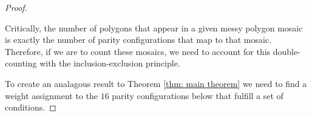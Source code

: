 \documentclass[12pt]{article}
\theoremstyle{plain}
\theoremstyle{definition}
\theoremstyle{remark}
\theoremstyle{definition}
\newcommand{\cellA}[4]{ \draw[thick] ( #1 , #2 ) rectangle ( #3 , #4 ); \draw[red, thick, densely dotted] (#3 * 0.5 + #1 * 0.5 , #2) -- (#3, #4 * 0.5 + #2 * 0.5);}
\newcommand{\cellB}[4]{ \draw[thick] ( #1 , #2 ) rectangle ( #3 , #4 ); \draw[red, thick, densely dotted] (#3 * 0.5 + #1 * 0.5 , #2) -- (#1, #4 * 0.5 + #2 * 0.5);}
\newcommand{\cellC}[4]{ \draw[thick] ( #1 , #2 ) rectangle ( #3 , #4 ); \draw[red, thick, densely dotted] (#3 * 0.5 + #1 * 0.5 , #4) -- (#1, #4 * 0.5 + #2 * 0.5);}
\newcommand{\cellD}[4]{ \draw[thick] ( #1 , #2 ) rectangle ( #3 , #4 ); \draw[red, thick, densely dotted] (#3 * 0.5 + #1 * 0.5 , #4) -- (#3, #4 * 0.5 + #2 * 0.5);}
\begin{document}
\begin{proof}
\begin{center}
\end{center}

Critically, the number of polygons that appear in a given messy polygon mosaic is exactly the number of parity configurations that map to that mosaic. 
Therefore, if we are to count these mosaics, we need to account for this double-counting with the inclusion-exclusion principle.  

To create an analagous result to Theorem \ref{thm: main theorem} we need to find a weight assignment to the $16$ parity configurations below that fulfill a set of conditions.


\end{proof}
\end{document}
